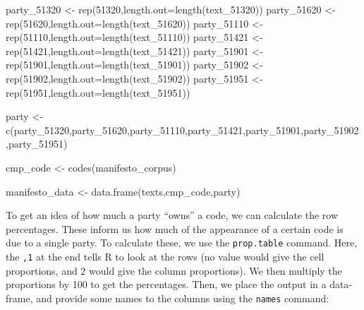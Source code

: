 \documentclass[
]{book}
\newenvironment{Shaded}{\begin{snugshade}}{\end{snugshade}}
\newcommand{\AttributeTok}[1]{\textcolor[rgb]{0.77,0.63,0.00}{#1}}
\newcommand{\DecValTok}[1]{\textcolor[rgb]{0.00,0.00,0.81}{#1}}
\newcommand{\FunctionTok}[1]{\textcolor[rgb]{0.00,0.00,0.00}{#1}}
\newcommand{\NormalTok}[1]{#1}
\newcommand{\OtherTok}[1]{\textcolor[rgb]{0.56,0.35,0.01}{#1}}
\begin{document}
\begin{Shaded}
\begin{Highlighting}[]
\NormalTok{party\_51320 }\OtherTok{\textless{}{-}} \FunctionTok{rep}\NormalTok{(}\DecValTok{51320}\NormalTok{,}\AttributeTok{length.out=}\FunctionTok{length}\NormalTok{(text\_51320))}
\NormalTok{party\_51620 }\OtherTok{\textless{}{-}} \FunctionTok{rep}\NormalTok{(}\DecValTok{51620}\NormalTok{,}\AttributeTok{length.out=}\FunctionTok{length}\NormalTok{(text\_51620))}
\NormalTok{party\_51110 }\OtherTok{\textless{}{-}} \FunctionTok{rep}\NormalTok{(}\DecValTok{51110}\NormalTok{,}\AttributeTok{length.out=}\FunctionTok{length}\NormalTok{(text\_51110))}
\NormalTok{party\_51421 }\OtherTok{\textless{}{-}} \FunctionTok{rep}\NormalTok{(}\DecValTok{51421}\NormalTok{,}\AttributeTok{length.out=}\FunctionTok{length}\NormalTok{(text\_51421))}
\NormalTok{party\_51901 }\OtherTok{\textless{}{-}} \FunctionTok{rep}\NormalTok{(}\DecValTok{51901}\NormalTok{,}\AttributeTok{length.out=}\FunctionTok{length}\NormalTok{(text\_51901))}
\NormalTok{party\_51902 }\OtherTok{\textless{}{-}} \FunctionTok{rep}\NormalTok{(}\DecValTok{51902}\NormalTok{,}\AttributeTok{length.out=}\FunctionTok{length}\NormalTok{(text\_51902))}
\NormalTok{party\_51951 }\OtherTok{\textless{}{-}} \FunctionTok{rep}\NormalTok{(}\DecValTok{51951}\NormalTok{,}\AttributeTok{length.out=}\FunctionTok{length}\NormalTok{(text\_51951))}

\NormalTok{party }\OtherTok{\textless{}{-}} \FunctionTok{c}\NormalTok{(party\_51320,party\_51620,party\_51110,party\_51421,party\_51901,party\_51902,party\_51951)}

\NormalTok{cmp\_code }\OtherTok{\textless{}{-}} \FunctionTok{codes}\NormalTok{(manifesto\_corpus)}

\NormalTok{manifesto\_data }\OtherTok{\textless{}{-}} \FunctionTok{data.frame}\NormalTok{(texts,cmp\_code,party)}
\end{Highlighting}
\end{Shaded}

To get an idea of how much a party ``owns'' a code, we can calculate the row percentages. These inform us how much of the appearance of a certain code is due to a single party. To calculate these, we use the \texttt{prop.table} command. Here, the \texttt{,1} at the end tells R to look at the rows (no value would give the cell proportions, and 2 would give the column proportions). We then multiply the proportions by 100 to get the percentages. Then, we place the output in a data-frame, and provide some names to the columns using the \texttt{names} command:
\end{document}
